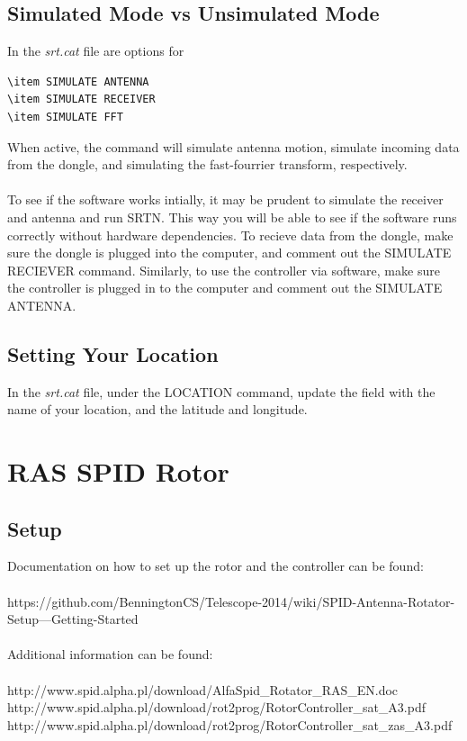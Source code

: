 \documentclass[11pt]{article} %
\begin{document}
\subsection{Simulated Mode vs Unsimulated Mode}

In the \emph{srt.cat} file are options for 

\begin{verbatim}
\item SIMULATE ANTENNA
\item SIMULATE RECEIVER
\item SIMULATE FFT
\end{verbatim}

When active, the command will simulate antenna motion, simulate incoming data from the dongle, and simulating the fast-fourrier transform, respectively. 
\\ \\
To see if the software works intially, it may be prudent to simulate the receiver and antenna and run SRTN. This way you will be able to see if the software runs correctly without hardware dependencies. To recieve data from the dongle, make sure the dongle is plugged into the computer, and comment out the SIMULATE RECIEVER command. Similarly, to use the controller via software, make sure the controller is plugged in to the computer and comment out the SIMULATE ANTENNA.

\subsection{Setting Your Location}

In the \emph{srt.cat} file, under the LOCATION command, update the field with the name of your location, and the latitude and longitude. 






\newpage
\section{RAS SPID Rotor}

\subsection{Setup}

Documentation on how to set up the rotor and the controller can be found: \\ \\
https://github.com/BenningtonCS/Telescope-2014/wiki/SPID-Antenna-Rotator-Setup---Getting-Started
\\ \\
Additional information can be found: \\ \\
http://www.spid.alpha.pl/download/AlfaSpid\_Rotator\_RAS\_EN.doc \\
http://www.spid.alpha.pl/download/rot2prog/RotorController\_sat\_A3.pdf \\
http://www.spid.alpha.pl/download/rot2prog/RotorController\_sat\_zas\_A3.pdf \\
\end{document}
